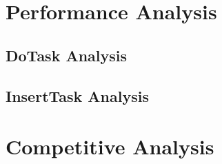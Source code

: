 \section{Performance Analysis}
\subsection*{DoTask Analysis}
\subsection*{InsertTask Analysis}

\section{Competitive Analysis}
